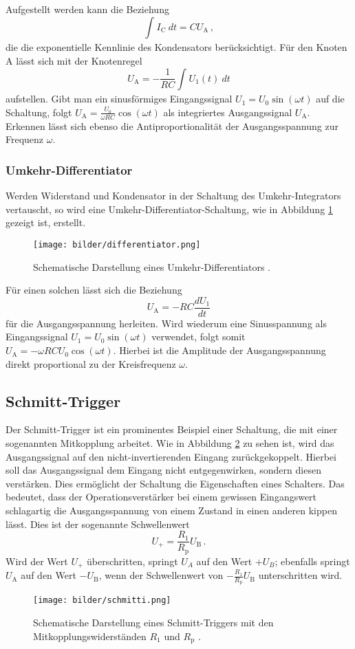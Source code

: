 Aufgestellt werden kann die Beziehung
\begin{equation}
  \int_{}^{} I_\text{C} \ dt=CU_\text{A}\,,
\end{equation}
die die exponentielle Kennlinie des Kondensators berücksichtigt.
Für den Knoten A lässt sich mit der Knotenregel
\begin{equation}
  U_\text{A}=-\frac{1}{RC}\int_{}^{} U_1(t) \ dt
\end{equation}
aufstellen. Gibt man ein sinusförmiges Eingangssignal $U_1=U_0\sin(\omega t)$ auf die Schaltung, folgt $U_\text{A}=\frac{U_0}{\omega RC}\cos(\omega t)$ als integriertes Ausgangssignal $U_\text{A}$. Erkennen lässt sich ebenso die Antiproportionalität der Ausgangsspannung zur Frequenz $\omega$.
\subsubsection{Umkehr-Differentiator}
Werden Widerstand und Kondensator in der Schaltung des Umkehr-Integrators vertauscht, so wird eine Umkehr-Differentiator-Schaltung, wie in Abbildung \ref{differentiator} gezeigt ist, erstellt.

\begin{figure}[H]
  \centering
  \texttt{[image: bilder/differentiator.png]}
  \caption{Schematische Darstellung eines Umkehr-Differentiators \cite{anleitung}.}
  \label{differentiator}
\end{figure}

Für einen solchen lässt sich die Beziehung
\begin{equation}
  U_\text{A}=-RC\frac{dU_1}{dt}
\end{equation}
für die Ausgangsspannung herleiten. Wird wiederum eine Sinusspannung als Eingangssignal $U_1=U_0\sin(\omega t)$ verwendet, folgt somit $U_\text{A}=-\omega RCU_0\cos(\omega t)$. Hierbei ist die Amplitude der Ausgangsspannung direkt proportional zu der Kreisfrequenz $\omega$.
\subsection{Schmitt-Trigger}
Der Schmitt-Trigger ist ein prominentes Beispiel einer Schaltung, die mit einer sogenannten Mitkopplung arbeitet. Wie in Abbildung \ref{schmitti} zu sehen ist, wird das Ausgangssignal auf den nicht-invertierenden Eingang zurückgekoppelt. Hierbei soll das Ausgangssignal dem Eingang nicht entgegenwirken, sondern diesen verstärken. Dies ermöglicht der Schaltung die Eigenschaften eines Schalters. Das bedeutet, dass der Operationsverstärker bei einem gewissen Eingangswert schlagartig die Ausgangsspannung von einem Zustand in einen anderen kippen lässt.
Dies ist der sogenannte Schwellenwert
\begin{equation}
U_+=\frac{R_1}{R_\text{p}}U_\text{B}\,.
\label{eq:schmitti}
\end{equation}
Wird der Wert $U_+$ überschritten, springt $U_A$ auf den Wert $+U_B$; ebenfalls springt $U_\text{A}$ auf den Wert $-U_\text{B}$, wenn der Schwellenwert von $-\frac{R_1}{R_\text{p}}U_\text{B}$ unterschritten wird.

\begin{figure}[H]
  \centering
  \texttt{[image: bilder/schmitti.png]}
  \caption{Schematische Darstellung eines Schmitt-Triggers mit den Mitkopplungswiderständen $R_1$ und $R_\text{p}$ \cite{anleitung}.}
  \label{schmitti}
\end{figure}
